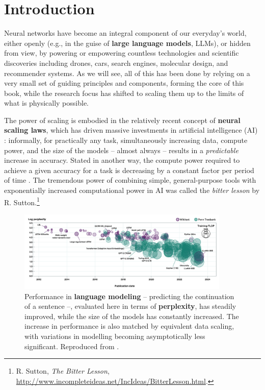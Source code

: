 \chapter{Introduction}
\label{chap:introduction}

Neural networks have become an integral component of our everyday’s world, either openly (e.g., in the guise of \textbf{large language models}, LLMs), or hidden from view, by powering or empowering countless technologies and scientific discoveries \cite{wang2023scientific} including drones, cars, search engines, molecular design, and recommender systems. As we will see, all of this has been done by relying on a very small set of guiding principles and components, forming the core of this book, while the research focus has shifted to scaling them up to the limits of what is physically possible.

The power of scaling is embodied in the relatively recent concept of \textbf{neural scaling laws}, which has driven massive investments in artificial intelligence (AI) \cite{kaplan2020scaling,ho2024algorithmic}: informally, for practically any task, simultaneously increasing data, compute power, and the size of the models -- almost always -- results in a \textit{predictable} increase in accuracy. Stated in another way, the compute power required to achieve a given accuracy for a task is decreasing by a constant factor per period of time \cite{ho2024algorithmic}. The tremendous power of combining simple, general-purpose tools with exponentially increased computational power in AI was called the \textit{bitter lesson} by R. Sutton.\footnote{R. Sutton, \textit{The Bitter Lesson}, \url{http://www.incompleteideas.net/IncIdeas/BitterLesson.html}.}

\begin{figure}
    \centering
    \includegraphics[width=0.9\textwidth]{images/compute_scaling.png}
    \caption{Performance in \textbf{language modeling} -- predicting the continuation of a sentence --, evaluated here in terms of \textbf{perplexity}, has steadily improved, while the size of the models has constantly increased. The increase in performance is also matched by equivalent data scaling, with variations in modelling becoming asymptotically less significant. Reproduced from \cite{ho2024algorithmic}.}
    \label{fig:compute_scaling}
\end{figure}

